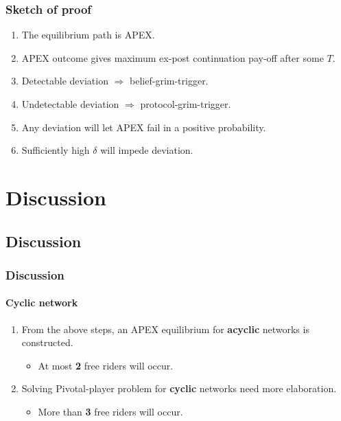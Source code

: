 \documentclass[9pt]{beamer}
\begin{document}
\begin{frame}
\frametitle{Sketch of proof}

\begin{enumerate}
\item The equilibrium path is APEX.
\item APEX outcome gives maximum ex-post continuation pay-off after some $T$.
\item Detectable deviation $\Rightarrow$ belief-grim-trigger. \hyperlink{belief_grim_trigger}{}
\item Undetectable deviation $\Rightarrow$ protocol-grim-trigger. \hyperlink{protocol_grim_trigger}{}
\item Any deviation will let APEX fail in a positive probability.
\item Sufficiently high $\delta$ will impede deviation.
\end{enumerate}



\end{frame}


\section{Discussion}
\subsection{Discussion}

\begin{frame}[label=cyclic_diss]
\frametitle{Discussion}
\framesubtitle{Cyclic network}
\begin{enumerate}


\item From the above steps, an APEX equilibrium for \textbf{acyclic} networks is constructed.
\begin{itemize}
\item At most \textbf{2} free riders will occur. \hyperlink{acyclic_diss}{}
\end{itemize}
\item Solving Pivotal-player problem for \textbf{cyclic} networks need more elaboration.
\begin{itemize}
\item More than \textbf{3} free riders will occur. \hyperlink{ex_cyclic}{}
\end{itemize}

\end{enumerate}


\end{frame}
\end{document}
